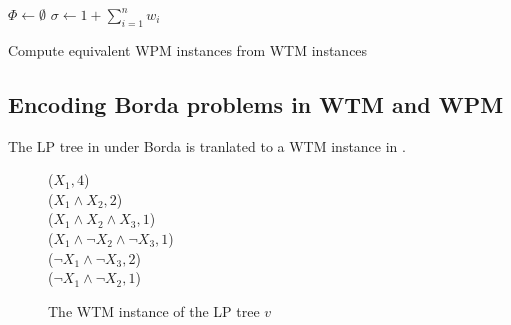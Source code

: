 \begin{algorithm}[ht]
	$\Phi \leftarrow \emptyset$\;
	$\sigma \leftarrow 1+\sum^n_{i=1} w_i$\;
\Return{$\Phi$}
\caption{Compute equivalent WPM instances from WTM instances}
\label{alg:wtm_wpm}
\end{algorithm}


\subsection{Encoding Borda problems in WTM and WPM}
The LP tree in  under Borda is tranlated to a WTM instance
in .
\begin{figure}[ht]
   \small
	\begin{framed}
		($X_1,4$)\\
		($X_1 \wedge X_2, 2$)\\
		($X_1 \wedge X_2 \wedge X_3, 1$)\\
		($X_1 \wedge \neg X_2 \wedge \neg X_3, 1$)\\
		($\neg X_1 \wedge \neg X_3, 2$)\\
		($\neg X_1 \wedge \neg X_2, 1$)
	\end{framed}
	\caption{The WTM instance of the LP tree $v$}
  \label{fig:borda_wtm}
\end{figure}

